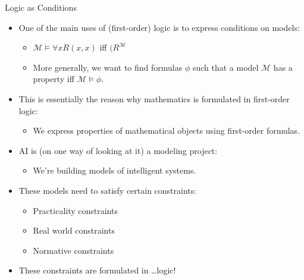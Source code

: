 \documentclass[../slides.tex]{subfiles}
\begin{document}
\begin{frame}{Logic as Conditions}

  \begin{itemize}
  \item One of the main uses of (first-order) logic is to express
    conditions on models:

    \begin{itemize}
    \item $\mathcal{M}\vDash \forall xR(x,x)$ iff $(R^\mathcal{M}$ 

      \item More generally, we want to find formulas $\phi$ such that
        a model $\mathcal{M}$ has a property iff $\mathcal{M}\vDash\phi$.
    \end{itemize}

    \item This is essentially the reason why mathematics is formulated
      in first-order logic:
      \begin{itemize}
      \item We express properties of mathematical objects using
        first-order formulas.
      \end{itemize}
      
      \item AI is (on one way of looking at it) a modeling project:
        \begin{itemize}
        \item We're building models of intelligent systems.
        \end{itemize}
       \item These models need to satisfy certain constraints:
         \begin{itemize}
           \item Practicality constraints
           \item Real world constraints
             \item Normative constraints
         \end{itemize}
         \item These constraints are formulated in \dots logic!

  \end{itemize}
  
\end{frame}
\end{document}
